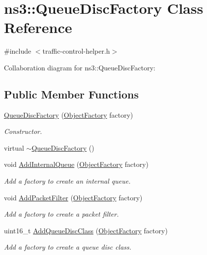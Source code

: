 \hypertarget{classns3_1_1QueueDiscFactory}{}\section{ns3\+:\+:Queue\+Disc\+Factory Class Reference}
\label{classns3_1_1QueueDiscFactory}


{\ttfamily \#include $<$traffic-\/control-\/helper.\+h$>$}



Collaboration diagram for ns3\+:\+:Queue\+Disc\+Factory\+:
\subsection*{Public Member Functions}
\begin{DoxyCompactItemize}
\item 
\hyperlink{classns3_1_1QueueDiscFactory_a887563b04e3a83a5f00bddb6388e2b80}{Queue\+Disc\+Factory} (\hyperlink{classns3_1_1ObjectFactory}{Object\+Factory} factory)
\begin{DoxyCompactList}\small\item\em Constructor. \end{DoxyCompactList}\item 
virtual \hyperlink{classns3_1_1QueueDiscFactory_a294b7492a8f1d243b94509210a7b737e}{$\sim$\+Queue\+Disc\+Factory} ()
\item 
void \hyperlink{classns3_1_1QueueDiscFactory_a3d96bda56aa37cda0de80c0125a507a8}{Add\+Internal\+Queue} (\hyperlink{classns3_1_1ObjectFactory}{Object\+Factory} factory)
\begin{DoxyCompactList}\small\item\em Add a factory to create an internal queue. \end{DoxyCompactList}\item 
void \hyperlink{classns3_1_1QueueDiscFactory_a49fbb900fab9514dc22ff0c9be495046}{Add\+Packet\+Filter} (\hyperlink{classns3_1_1ObjectFactory}{Object\+Factory} factory)
\begin{DoxyCompactList}\small\item\em Add a factory to create a packet filter. \end{DoxyCompactList}\item 
uint16\+\_\+t \hyperlink{classns3_1_1QueueDiscFactory_a31ab2aa5db1285d9e804475f763745f5}{Add\+Queue\+Disc\+Class} (\hyperlink{classns3_1_1ObjectFactory}{Object\+Factory} factory)
\begin{DoxyCompactList}\small\item\em Add a factory to create a queue disc class. \end{DoxyCompactList}\item 

\end{DoxyCompactItemize}
